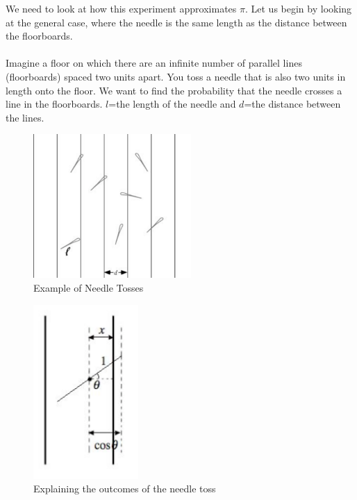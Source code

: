 We need to look at how this experiment approximates $\pi$. Let us begin by looking at the general case, where the needle is the same length as the distance between the floorboards.
\\
\\
Imagine a floor on which there are an infinite number of parallel lines (floorboards) spaced two units apart. You toss a needle that is also two units in length onto the floor. We want to find the probability that the needle crosses a line in the floorboards. $l$=the length of the needle and $d$=the distance between the lines.
\\
\begin{figure}[h]
\begin{center}
\includegraphics[width=6cm]{figures/BuffonNeedle_700}
\caption{Example of Needle Tosses}
\end{center}
\end{figure}


\begin{figure}[h]
\begin{center}
\includegraphics[width=4cm]{figures/BuffonNeedle_clip}
\caption{Explaining the outcomes of the needle toss}
\end{center}
\end{figure}

